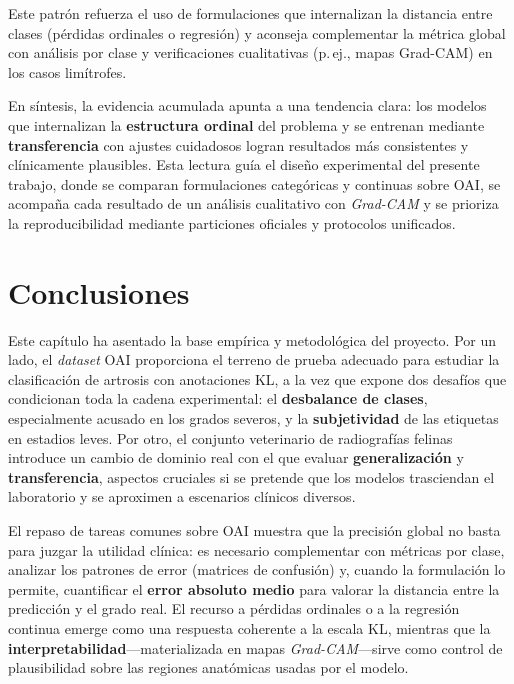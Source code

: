 \documentclass[11pt,spanish,listoffigures,listoftables]{tfgetsinf}
\begin{document}
Este patrón refuerza el uso de formulaciones que internalizan la distancia
entre clases (pérdidas ordinales o regresión) y aconseja complementar la
métrica global con análisis por clase y verificaciones cualitativas (p.\,ej.,
mapas Grad-CAM) en los casos limítrofes.

En síntesis, la evidencia acumulada apunta a una tendencia clara: los modelos
que internalizan la \textbf{estructura ordinal} del problema y se entrenan
mediante \textbf{transferencia} con ajustes cuidadosos logran resultados más
consistentes y clínicamente plausibles. Esta lectura guía el diseño
experimental del presente trabajo, donde se comparan formulaciones categóricas
y continuas sobre OAI, se acompaña cada resultado de un análisis cualitativo
con \emph{Grad-CAM} y se prioriza la reproducibilidad mediante particiones
oficiales y protocolos unificados.

\section{Conclusiones}
\label{sec:3_5_conclusiones}

Este capítulo ha asentado la base empírica y metodológica del proyecto. Por un
lado, el \emph{dataset} OAI proporciona el terreno de prueba adecuado para
estudiar la clasificación de artrosis con anotaciones KL, a la vez que expone
dos desafíos que condicionan toda la cadena experimental: el \textbf{desbalance
	de clases}, especialmente acusado en los grados severos, y la
\textbf{subjetividad} de las etiquetas en estadios leves. Por otro, el conjunto
veterinario de radiografías felinas introduce un cambio de dominio real con el
que evaluar \textbf{generalización} y \textbf{transferencia}, aspectos
cruciales si se pretende que los modelos trasciendan el laboratorio y se
aproximen a escenarios clínicos diversos.

El repaso de tareas comunes sobre OAI muestra que la precisión global no basta
para juzgar la utilidad clínica: es necesario complementar con métricas por
clase, analizar los patrones de error (matrices de confusión) y, cuando la
formulación lo permite, cuantificar el \textbf{error absoluto medio} para
valorar la distancia entre la predicción y el grado real. El recurso a pérdidas
ordinales o a la regresión continua emerge como una respuesta coherente a la
escala KL, mientras que la \textbf{interpretabilidad}—materializada en mapas
\emph{Grad-CAM}—sirve como control de plausibilidad sobre las regiones
anatómicas usadas por el modelo.
\end{document}
